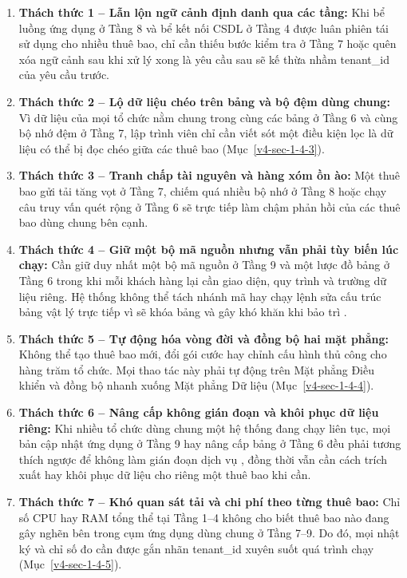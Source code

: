 \begin{enumerate}
\def\labelenumi{\arabic{enumi}.}
\item
  \textbf{Thách thức 1 -- Lẫn lộn ngữ cảnh định danh qua các tầng:} Khi bể luồng ứng dụng ở Tầng 8 và bể kết nối CSDL ở Tầng 4 được luân phiên tái sử dụng cho nhiều thuê bao, chỉ cần thiếu bước kiểm tra ở Tầng 7 hoặc quên xóa ngữ cảnh sau khi xử lý xong là yêu cầu sau sẽ kế thừa nhầm tenant\_\allowbreak{}id của yêu cầu trước.
\item
  \textbf{Thách thức 2 -- Lộ dữ liệu chéo trên bảng và bộ đệm dùng chung:} Vì dữ liệu của mọi tổ chức nằm chung trong cùng các bảng ở Tầng 6 và cùng bộ nhớ đệm ở Tầng 7, lập trình viên chỉ cần viết sót một điều kiện lọc là dữ liệu có thể bị đọc chéo giữa các thuê bao (Mục~\ref{v4-sec-1-4-3}).
\item
  \textbf{Thách thức 3 -- Tranh chấp tài nguyên và hàng xóm ồn ào:} Một thuê bao gửi tải tăng vọt ở Tầng 7, chiếm quá nhiều bộ nhớ ở Tầng 8 hoặc chạy câu truy vấn quét rộng ở Tầng 6 sẽ trực tiếp làm chậm phản hồi của các thuê bao dùng chung bên cạnh.
\item
  \textbf{Thách thức 4 -- Giữ một bộ mã nguồn nhưng vẫn phải tùy biến lúc chạy:} Cần giữ duy nhất một bộ mã nguồn ở Tầng 9 và một lược đồ bảng ở Tầng 6 trong khi mỗi khách hàng lại cần giao diện, quy trình và trường dữ liệu riêng. Hệ thống không thể tách nhánh mã hay chạy lệnh sửa cấu trúc bảng vật lý trực tiếp vì sẽ khóa bảng và gây khó khăn khi bảo trì \cite{v4-17}.
\item
  \textbf{Thách thức 5 -- Tự động hóa vòng đời và đồng bộ hai mặt phẳng:} Không thể tạo thuê bao mới, đổi gói cước hay chỉnh cấu hình thủ công cho hàng trăm tổ chức. Mọi thao tác này phải tự động trên Mặt phẳng Điều khiển và đồng bộ nhanh xuống Mặt phẳng Dữ liệu (Mục~\ref{v4-sec-1-4-4}).
\item
  \textbf{Thách thức 6 -- Nâng cấp không gián đoạn và khôi phục dữ liệu riêng:} Khi nhiều tổ chức dùng chung một hệ thống đang chạy liên tục, mọi bản cập nhật ứng dụng ở Tầng 9 hay nâng cấp bảng ở Tầng 6 đều phải tương thích ngược để không làm gián đoạn dịch vụ \cite{v4-17}, đồng thời vẫn cần cách trích xuất hay khôi phục dữ liệu cho riêng một thuê bao khi cần.
\item
  \textbf{Thách thức 7 -- Khó quan sát tải và chi phí theo từng thuê bao:} Chỉ số CPU hay RAM tổng thể tại Tầng 1--4 không cho biết thuê bao nào đang gây nghẽn bên trong cụm ứng dụng dùng chung ở Tầng 7--9. Do đó, mọi nhật ký và chỉ số đo cần được gắn nhãn tenant\_\allowbreak{}id xuyên suốt quá trình chạy (Mục~\ref{v4-sec-1-4-5}).
\end{enumerate}

